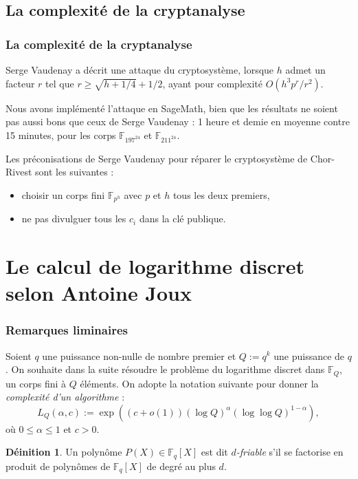 \documentclass{beamer}
\theoremstyle{definition}
\newtheorem{defi}[theo]{Déinition}
\theoremstyle{remark}
\def\O{O}
\def\o{o}
\def\gf #1{\mathbb{F}_{#1}}
\begin{document}
\subsection{La complexité de la cryptanalyse}
\begin{frame}
  \frametitle{La complexité de la cryptanalyse}
  Serge Vaudenay a décrit une attaque du cryptosystème, lorsque $h$ admet un facteur $r$ tel que $r \geqslant \sqrt{h + 1/4} + 1/2$, ayant pour complexité $\O(h^3p^r/r^2)$.
  
  Nous avons implémenté l'attaque en SageMath, bien que les résultats ne soient pas aussi bons que ceux de Serge Vaudenay : 1 heure et demie en moyenne contre 15 minutes, pour les corps $\gf{197^{24}}$ et $\gf{211^{24}}$.
  
  Les préconisations de Serge Vaudenay pour réparer le cryptosystème de Chor-Rivest sont les suivantes : \begin{itemize}
  \item choisir un corps fini $\gf{p^h}$ avec $p$ et $h$ tous les deux premiers,
  \item ne pas divulguer tous les $c_i$ dans la clé publique.
  \end{itemize}
\end{frame}

\section{Le calcul de logarithme discret selon Antoine Joux}
\begin{frame}
  \frametitle{Remarques liminaires}
  Soient $q$ une puissance non-nulle de nombre premier et $Q := q^k$ une puissance de $q$. On souhaite dans la suite résoudre le problème du logarithme discret dans $\gf{Q}$, un corps fini à $Q$ éléments. On adopte la notation suivante pour donner la \textit{complexité d'un algorithme} :
  $$L_{Q}(\alpha, c) := \exp\left({(c+\o(1))(\log Q)^\alpha(\log\log Q)^{1 - \alpha}}\right),$$
  où $0 \leqslant \alpha\leqslant 1$ et $c > 0$.

  \begin{defi}
Un polynôme $P(X) \in \gf{q}[X]$ est dit \textit{$d$-friable} s'il se factorise en produit de polynômes de $\gf{q}[X]$ de degré au plus $d$.
\end{defi}
\end{frame}
\end{document}
